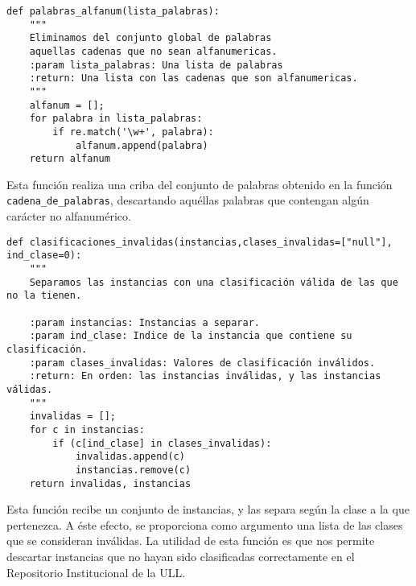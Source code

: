 \begin{center}
\begin{minipage}{\linewidth}
\begin{lstlisting}[caption=Función que retorna palabras alfanuméricas]
def palabras_alfanum(lista_palabras):
    """
    Eliminamos del conjunto global de palabras
    aquellas cadenas que no sean alfanumericas.
    :param lista_palabras: Una lista de palabras
    :return: Una lista con las cadenas que son alfanumericas.
    """
    alfanum = [];
    for palabra in lista_palabras:
        if re.match('\w+', palabra):
            alfanum.append(palabra)
    return alfanum
\end{lstlisting}
\end{minipage}
\end{center}

Esta función realiza una criba del conjunto de palabras obtenido en la función \texttt{cadena\_de\_palabras}, descartando aquéllas palabras que contengan algún carácter no alfanumérico.

\begin{center}
\begin{minipage}{\linewidth}
\begin{lstlisting}[caption=Función que separa las instancias con clasificación inválida.]
def clasificaciones_invalidas(instancias,clases_invalidas=["null"], ind_clase=0):
    """
    Separamos las instancias con una clasificación válida de las que no la tienen.

    :param instancias: Instancias a separar.
    :param ind_clase: Indice de la instancia que contiene su clasificación.
    :param clases_invalidas: Valores de clasificación inválidos.
    :return: En orden: las instancias inválidas, y las instancias válidas.
    """
    invalidas = [];
    for c in instancias:
        if (c[ind_clase] in clases_invalidas):
            invalidas.append(c)
            instancias.remove(c)
    return invalidas, instancias
\end{lstlisting}
\end{minipage}
\end{center}

Esta función recibe un conjunto de instancias, y las separa según la clase a la que pertenezca. A éste efecto, se proporciona como argumento una lista de las clases que se consideran inválidas.
%
La utilidad de esta función es que nos permite descartar instancias que no hayan sido clasificadas correctamente en el Repositorio Institucional de la ULL.

